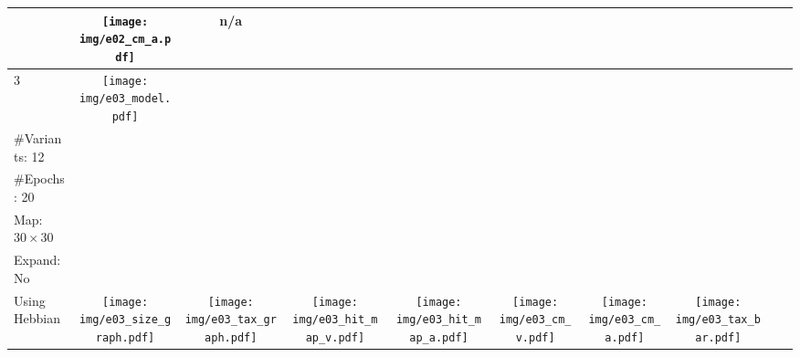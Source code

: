 \documentclass[twocolumn]{article}
\begin{document}
\begin{landscape}
\begin{table}
\begin{tabular}{lccccccccc}
\begin{minipage}{1.7cm}
            \end{minipage}
            & \begin{minipage}{1.7cm}
                \texttt{[image: img/e02\_cm\_a.pdf]}
            \end{minipage}
            & n/a
            \\
        \hline
        3
            & \begin{minipage}{1.7cm}
                \texttt{[image: img/e03\_model.pdf]}
            \end{minipage}
            & \begin{minipage}{2cm}
                \scriptsize
                \#Categories: 30 \\
                \#Variants: 12 \\
                \#Epochs: 20 \\
                Map: $30 \times 30$ \\
                Expand: No \\
                Using Hebbian
            \end{minipage}
            & \begin{minipage}{1.7cm}
                \texttt{[image: img/e03\_size\_graph.pdf]}
            \end{minipage}
            & \begin{minipage}{1.7cm}
                \texttt{[image: img/e03\_tax\_graph.pdf]}
            \end{minipage}
            & \begin{minipage}{1.7cm}
                \texttt{[image: img/e03\_hit\_map\_v.pdf]}
            \end{minipage}
            & \begin{minipage}{1.7cm}
                \texttt{[image: img/e03\_hit\_map\_a.pdf]}
            \end{minipage}
            & \begin{minipage}{1.7cm}
                \texttt{[image: img/e03\_cm\_v.pdf]}
            \end{minipage}
            & \begin{minipage}{1.7cm}
                \texttt{[image: img/e03\_cm\_a.pdf]}
            \end{minipage}
            & \begin{minipage}{1.7cm}
                \texttt{[image: img/e03\_tax\_bar.pdf]}

\end{minipage}
\end{tabular}
\end{table}
\end{landscape}
\end{document}

